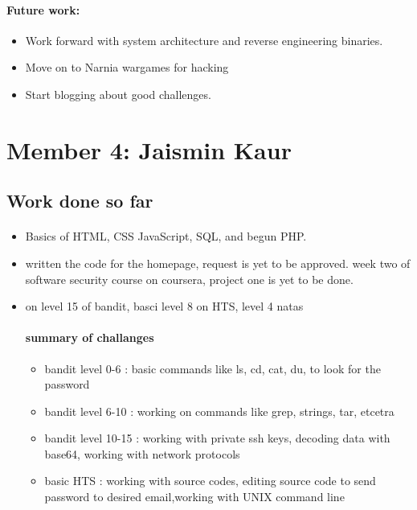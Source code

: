 \documentclass{article}
\begin{document}
\begin{itemize}
\paragraph{Future work:}
\begin{itemize}
	\item Work forward with system architecture and reverse engineering binaries.
	\item Move on to Narnia wargames for hacking
	\item Start blogging about good challenges.
\end{itemize}


\newpage
\section*{Member 4: Jaismin Kaur}
\subsection*{Work done so far}
\paragraph{}
\begin{itemize}
    \item Basics of HTML, CSS JavaScript, SQL, and begun PHP.
    \item written the code for the homepage, request is yet to be approved.
    \itemon week two of software security course on coursera, project one is yet to be done.
    \item on level 15 of bandit, basci level 8 on HTS, level 4 natas
\paragraph{summary of challanges} 
\begin{itemize}
    \item bandit level 0-6 : basic commands like ls, cd, cat, du, to look for the password
    \item bandit level 6-10 : working on commands like grep, strings, tar, etcetra
    \item bandit level 10-15 : working with private ssh keys, decoding data with base64, working with network protocols
    \item basic HTS : working with source codes, editing source code to send password to desired email,working with UNIX command line

\end{itemize}
\end{itemize}
\end{itemize}
\end{document}
